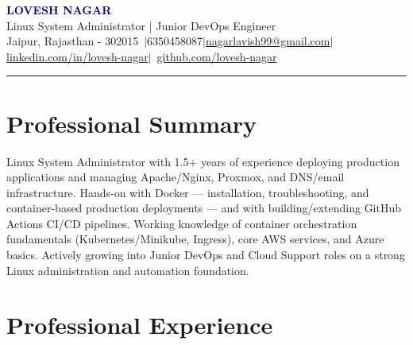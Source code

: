 \documentclass[11pt,a4paper]{article}
\begin{document}
\begin{center}
  {\fontsize{23}{26}\selectfont\bfseries\textcolor{navy}{LOVESH NAGAR}}\\[3pt]
  {\textcolor{midgray}{Linux System Administrator | Junior DevOps Engineer}}\\[5pt]
  \footnotesize Jaipur, Rajasthan - 302015~$\vert$6350458087$\vert$\href{mailto:nagarlavish99@gmail.com}{nagarlavish99@gmail.com}$\vert$\href{https://www.linkedin.com/in/lovesh-nagar}{linkedin.com/in/lovesh-nagar}$\vert$~\href{https://github.com/lovesh-nagar}{github.com/lovesh-nagar}
\end{center}
\vspace{-8pt}
{\color{gray!50}\hrule}
\vspace{2pt}

\section*{Professional Summary}
\justifying
\small
Linux System Administrator with 1.5+ years of experience deploying production applications and managing Apache/Nginx, Proxmox, and DNS/email infrastructure. Hands-on with Docker --- installation, troubleshooting, and container-based production deployments --- and with building/extending GitHub Actions CI/CD pipelines. Working knowledge of container orchestration fundamentals (Kubernetes/Minikube, Ingress), core AWS services, and Azure basics. Actively growing into Junior DevOps and Cloud Support roles on a strong Linux administration and automation foundation.

\section*{Professional Experience}
\small
\end{document}
